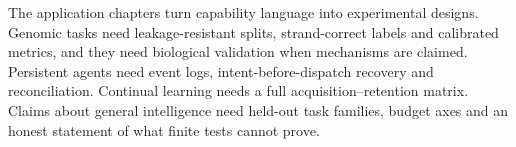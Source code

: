 The application chapters turn capability language into experimental designs. Genomic tasks need leakage-resistant splits, strand-correct labels and calibrated metrics, and they need biological validation when mechanisms are claimed. Persistent agents need event logs, intent-before-dispatch recovery and reconciliation. Continual learning needs a full acquisition--retention matrix. Claims about general intelligence need held-out task families, budget axes and an honest statement of what finite tests cannot prove.
